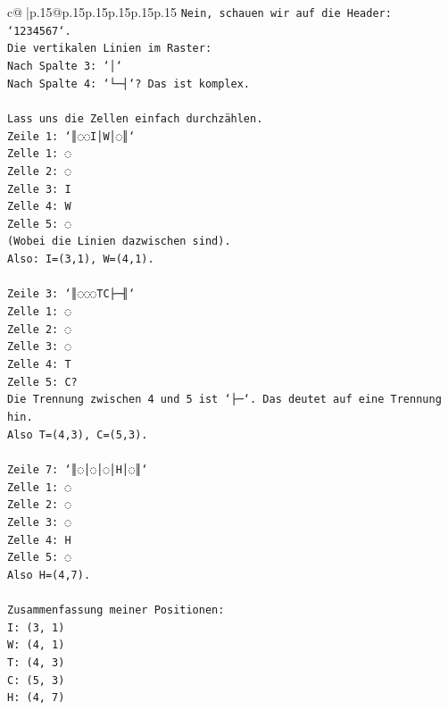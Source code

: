 \documentclass{article}
\begin{document}
{\begin{supertabular}{c@{$\;$}|p{.15\linewidth}@{}p{.15\linewidth}p{.15\linewidth}p{.15\linewidth}p{.15\linewidth}p{.15\linewidth}}
{{{\texttt{Nein, schauen wir auf die Header: `1234567`.} \\
\texttt{Die vertikalen Linien im Raster:} \\
\texttt{Nach Spalte 3: `│`} \\
\texttt{Nach Spalte 4: `└─┤`? Das ist komplex.} \\
\\ 
\texttt{Lass uns die Zellen einfach durchzählen.} \\
\texttt{Zeile 1: `║◌◌I│W│◌║`} \\
\texttt{Zelle 1: ◌} \\
\texttt{Zelle 2: ◌} \\
\texttt{Zelle 3: I} \\
\texttt{Zelle 4: W} \\
\texttt{Zelle 5: ◌} \\
\texttt{(Wobei die Linien dazwischen sind).} \\
\texttt{Also: I=(3,1), W=(4,1).} \\
\\ 
\texttt{Zeile 3: `║◌◌◌TC├─╢`} \\
\texttt{Zelle 1: ◌} \\
\texttt{Zelle 2: ◌} \\
\texttt{Zelle 3: ◌} \\
\texttt{Zelle 4: T} \\
\texttt{Zelle 5: C?} \\
\texttt{Die Trennung zwischen 4 und 5 ist `├─`. Das deutet auf eine Trennung hin.} \\
\texttt{Also T=(4,3), C=(5,3).} \\
\\ 
\texttt{Zeile 7: `║◌│◌│◌│H│◌║`} \\
\texttt{Zelle 1: ◌} \\
\texttt{Zelle 2: ◌} \\
\texttt{Zelle 3: ◌} \\
\texttt{Zelle 4: H} \\
\texttt{Zelle 5: ◌} \\
\texttt{Also H=(4,7).} \\
\\ 
\texttt{Zusammenfassung meiner Positionen:} \\
\texttt{I: (3, 1)} \\
\texttt{W: (4, 1)} \\
\texttt{T: (4, 3)} \\
\texttt{C: (5, 3)} \\
\texttt{H: (4, 7)} \\
}}}
\end{supertabular}}
\end{document}
